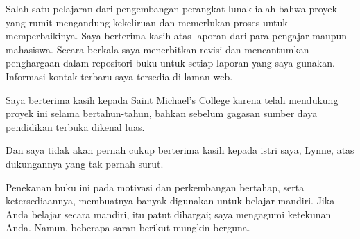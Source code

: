 {\medskip
{}
Salah satu pelajaran dari pengembangan
perangkat lunak ialah bahwa proyek yang rumit mengandung kekeliruan
dan memerlukan proses untuk memperbaikinya.
Saya berterima kasih atas laporan dari para pengajar maupun mahasiswa.
Secara berkala saya menerbitkan revisi dan mencantumkan penghargaan
dalam repositori buku untuk setiap laporan yang saya gunakan.
Informasi kontak terbaru saya tersedia di laman web.

Saya berterima kasih kepada Saint Michael's College
karena telah mendukung proyek ini selama bertahun-tahun, bahkan sebelum gagasan
sumber daya pendidikan terbuka dikenal luas.

Dan saya tidak akan pernah cukup berterima kasih kepada istri saya, Lynne,
atas dukungannya yang tak pernah surut.



\newcommand{\classday}[1]{\textsc{#1}}
\newcommand{\colwidth}{1.25in}

\medskip
%
Penekanan buku ini pada motivasi dan perkembangan bertahap,
serta ketersediaannya, membuatnya banyak digunakan untuk belajar mandiri.
Jika Anda belajar secara mandiri, itu patut dihargai; saya mengagumi ketekunan Anda.
Namun, beberapa saran berikut mungkin berguna.

}
